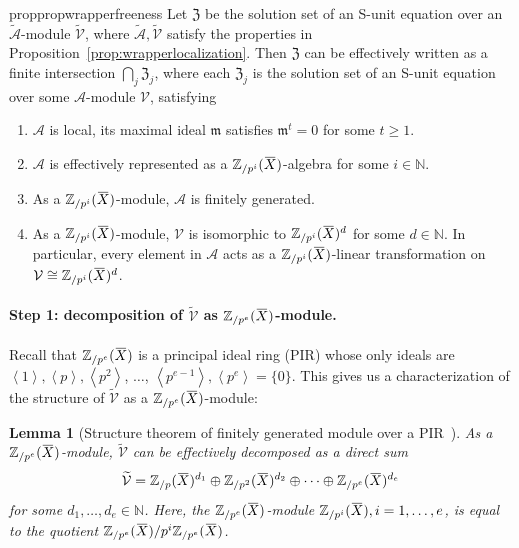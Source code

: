 \documentclass[letterpaper, 11pt, thm-restate]{article}
\numberwithin{equation}{section}
\newcommand{\N}{\mathbb{N}}
\newcommand{\Zpe}{\mathbb{Z}_{/p^e}}
\newcommand{\Zp}{\mathbb{Z}_{/p}}
\newcommand{\Zpt}{\mathbb{Z}_{/p^2}}
\newcommand{\Zpi}{\mathbb{Z}_{/p^i}}
\newcommand{\mV}{\mathcal{V}}
\newcommand{\mA}{\mathcal{A}}
\newcommand{\mZ}{\mathfrak{Z}}
\newcommand{\tmA}{\widetilde{\mathcal{A}}}
\newcommand{\tmV}{\widetilde{\mathcal{V}}}
\newcommand{\gen}[1]{\left\langle {#1} \right\rangle}
\newcommand{\oX}{\mkern 1.5mu\overline{\mkern-1.5mu X \mkern-1.5mu}\mkern 1.5mu}
\newcommand{\frm}{\mathfrak{m}}
\newtheorem{lem}[thrm]{Lemma}
\theoremstyle{definition}
\theoremstyle{definition}
\theoremstyle{definition}
\begin{document}
\begin{restatable}{prop}{propwrapperfreeness}\label{prop:wrapperfreeness}
    Let $\mZ$ be the solution set of an S-unit equation over an $\tmA$-module $\tmV$, where $\tmA, \tmV$ satisfy the properties in Proposition~\ref{prop:wrapperlocalization}.
    Then $\mZ$ can be effectively written as a finite intersection $\bigcap_j \mZ_{j}$, where each $\mZ_{j}$ is the solution set of an S-unit equation over some $\mA$-module $\mV$, satisfying
    \begin{enumerate}[nosep, label = (\roman*)]
        \item $\mA$ is local, its maximal ideal $\frm$ satisfies $\frm^t = 0$ for some $t \geq 1$.
        \item $\mA$ is effectively represented as a $\Zpi(\oX)$-algebra for some $i \in \N$. 
        \item As a $\Zpi(\oX)$-module, $\mA$ is finitely generated.
        \item As a $\Zpi(\oX)$-module, $\mV$ is isomorphic to $\Zpi(\oX)^d$ for some $d \in \N$.
        In particular, every element in $\mA$ acts as a $\Zpi(\oX)$-linear transformation on $\mV \cong \Zpi(\oX)^d$.
    \end{enumerate}
\end{restatable}

\paragraph{Step 1: decomposition of $\tmV$ as $\Zpe(\oX)$-module.}

Recall that $\Zpe(\oX)$ is a principal ideal ring (PIR) whose only ideals are $\gen{1}, \gen{p}, \gen{p^2}$, $\ldots$, $\gen{p^{e-1}}, \gen{p^{e}} = \{0\}$.
This gives us a characterization of the structure of $\tmV$ as a $\Zpe(\oX)$-module:

\begin{lem}[{Structure theorem of finitely generated module over a PIR~\cite[Theorem~15.33]{brown1993matrices}}]\label{lem:PIR}
    As a $\Zpe(\oX)$-module, $\tmV$ can be effectively decomposed as a direct sum
        \begin{equation}\label{eq:VdecomposePIR}
        \tmV = \Zp(\oX)^{d_1} \oplus \Zpt(\oX)^{d_2} \oplus \cdots \oplus \Zpe(\oX)^{d_e}
        \end{equation}
    for some $d_1, \ldots, d_e \in \N$.
    Here, the $\Zpe(\oX)$-module $\Zpi(\oX), i = 1, \ldots, e$, is equal to the quotient $\Zpe(\oX)/p^i\Zpe(\oX)$.
\end{lem}
\end{document}

